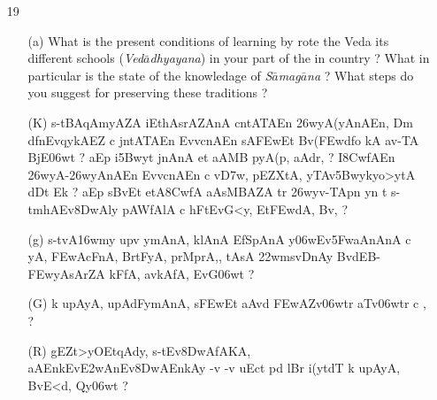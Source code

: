 {\begin{itemize}
  \item[19] \begin{itemize}
            
            \item[(a)] What is the present conditions of learning by rote the Veda its different schools ({\textit {Ved$\bar{a}$dhyayana}}) in your part of the in country ? What in particular is the state of the knowledage of {\textit {S$\bar{a}$mag$\bar{a}$na}} ? What steps do you suggest for preserving these traditions ?
\end{itemize}
\end{itemize}
}

\begin{itemize} 
\item[]		 \begin{itemize}               
                \item[({\dn K})] {\dn s\2-tBAqAmyAZA iEthAsrAZAnA\2 cntATA\0En \326wyA(yA\0nAEn{\rs ,\re} Dm\0\- df\0nEvqykAEZ c jntATA\0En Evv\?cnAEn sA\2\3FEwEt Bv(\3FEwd\?fo kA av-TA\2 BjE\306wt {\rs ?\re} aEp i\35Bwyt\? jnAnA et\? aAMB\?{\qvb} pyA\0(p, aAdr, {\rs ?\re} I\38CwfAEn \326wyA-\326wyAnAEn Evv\?cnAEn c v\0\3D7w, pEZXtA, yTAv\35Bwykyo>ytA\2 dDt\? Ek {\rs ?\re} aEp s\2BvEt etA\38CwfA aAsMBAZA\2 tr\2 \326wyv-TApn y\?n t\? s\2-tmhAEv\38DwAly\? pAWfAlA c hFtEvG\?<y, Et\3FEwdA, Bv\?, {\rs ?\re}}
                
                \item[({\dn g})] {\dn s\2-tvA\316wmy\? upv y\0mAnA, klAnA\2{\rs ,\re} EfSpAnA\2{\rs ,\re} y\306wEv\35FwaAnAnA\2 c yA, \3FEwAcFnA, BrtFyA, prMprA,{\rs ,\re} tAsA\2 \322w\?ms\2vD\0nAy BvdEB{\rs -\re}\3FEwyAsAr\?ZA kFfA, avkAfA, EvG\306wt\? {\rs ?\re}} 
                
                \item[({\dn G})] {\dn k\? upAyA, upAdFymAnA, s\2\3FEwEt aAv\?{\qvb}d\2 \3FEwAZv\306wtr aT{\rdt}v\306wtr\2 c \0, {\rs ?\re}}
                
                \item[({\dn R})] {\dn gEZt>yOEtqAdy, s\2-tEv\38DwAfAKA, aAEnk\-Ev\3E2wAnEv\38DwAEnkAy\? -v\2 -v uEct\2 pd\2 lB\?r i(y\?tdT\?{\qvb} k\? upAyA, BvE<d, Qy\306wt\? {\rs ?\re}}
               \end{itemize} 
               

\end{itemize}

